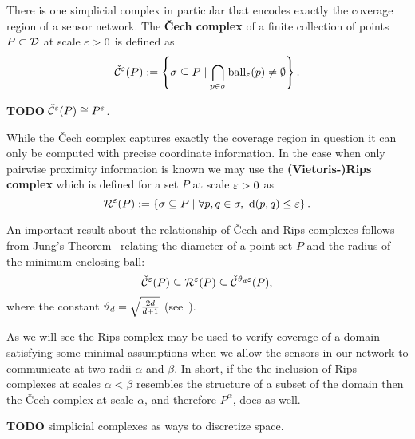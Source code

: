 There is one simplicial complex in particular that encodes exactly the coverage region of a sensor network.
The \textbf{\v Cech complex} of a finite collection of points $P\subset {\mathcal{D}}$ at scale $\varepsilon > 0$ is defined as
\[ \check{\mathcal{C}}^\varepsilon(P) := \left\{\sigma \subseteq P\mid \bigcap_{p\in \sigma}\mathrm{ball}_\varepsilon(p)\neq \emptyset \right\}. \]

\textbf{TODO} $\check{\mathcal{C}}^\varepsilon(P) \cong P^\varepsilon$.

While the \v Cech complex captures exactly the coverage region in question it can only be computed with precise coordinate information.
In the case when only pairwise proximity information is known we may use the \textbf{(Vietoris-)Rips complex} which is defined for a set $P$ at scale $\varepsilon > 0$ as
\[ \mathcal{R}^\varepsilon(P) := \left\{\sigma \subseteq P\mid \forall p,q\in\sigma,\ \mathrm{d}(p, q)\leq\varepsilon\right\}. \]

An important result about the relationship of \v Cech and Rips complexes follows from Jung's Theorem~\cite{jung01uber} relating the diameter of a point set $P$ and the radius of the minimum enclosing ball:
\begin{equation}\label{eq:jung_inclusion}
  \check{\mathcal{C}}^\varepsilon(P) \subseteq \mathcal{R}^\varepsilon(P) \subseteq \check{\mathcal{C}}^{\vartheta_d \varepsilon}(P),
\end{equation}
where the constant $\vartheta_d = \sqrt{\frac{2d}{d+1}}$ (see~\cite{buchet15efficient}).

As we will see the Rips complex may be used to verify coverage of a domain satisfying some minimal assumptions when we allow the sensors in our network to communicate at two radii $\alpha$ and $\beta$.
In short, if the the inclusion of Rips complexes at scales $\alpha < \beta$ resembles the structure of a subset of the domain then the \v Cech complex at scale $\alpha$, and therefore $P^\alpha$, does as well.

\textbf{TODO} simplicial complexes as ways to discretize space.


